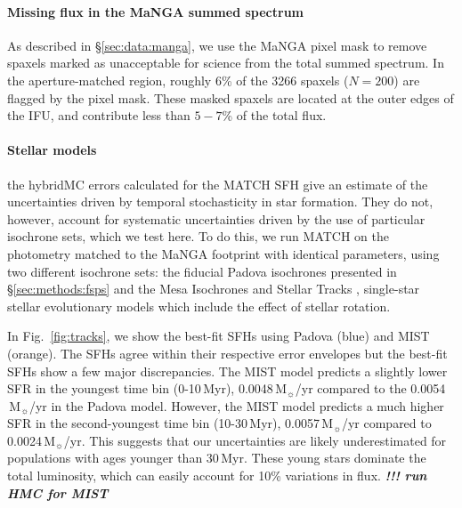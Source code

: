 \documentclass[preprint2]{aastex62}
\newcommand{\todo}[1]{\textbf{\textit{!!! #1}}}
\newcommand\Msun{\ensuremath{\,\mathrm{M_{\sun}}}\xspace}
\newcommand{\Myr}{$\,$Myr\xspace}
\begin{document}
\paragraph{Missing flux in the MaNGA summed spectrum} As described in \S\ref{sec:data:manga}, we use the MaNGA pixel mask to remove spaxels marked as unacceptable for science from the total summed spectrum. In the aperture-matched region, roughly 6\% of the 3266 spaxels ($N=200$) are flagged by the pixel mask. These masked spaxels are located at the outer edges of the IFU, and contribute less than $5-7$\% of the total flux. 

\paragraph{Stellar models} the hybridMC errors calculated for the MATCH SFH give an estimate of the uncertainties driven by temporal stochasticity in star formation. They do not, however, account for systematic uncertainties driven by the use of particular isochrone sets, which we test here. To do this, we run MATCH on the photometry matched to the MaNGA footprint with identical parameters, using two different isochrone sets: the fiducial Padova isochrones presented in \S\ref{sec:methods:fsps} and the Mesa Isochrones and Stellar Tracks \citep[MIST;][]{Dotter+2016, Choi+2016}, single-star stellar evolutionary models which include the effect of stellar rotation.

In Fig.~\ref{fig:tracks}, we show the best-fit SFHs using Padova (blue) and MIST (orange). The SFHs agree within their respective error envelopes but the best-fit SFHs show a few major discrepancies. The MIST model predicts a slightly lower SFR in the youngest time bin (0-10\Myr), 0.0048\Msun/yr compared to the 0.0054\Msun/yr in the Padova model. However, the MIST model predicts a much higher SFR in the second-youngest time bin (10-30\Myr), 0.0057\Msun/yr compared to 0.0024\Msun/yr. This suggests that our uncertainties are likely underestimated for populations with ages younger than 30\Myr. These young stars dominate the total luminosity, which can easily account for 10\% variations in flux. \todo{run HMC for MIST}
\end{document}
